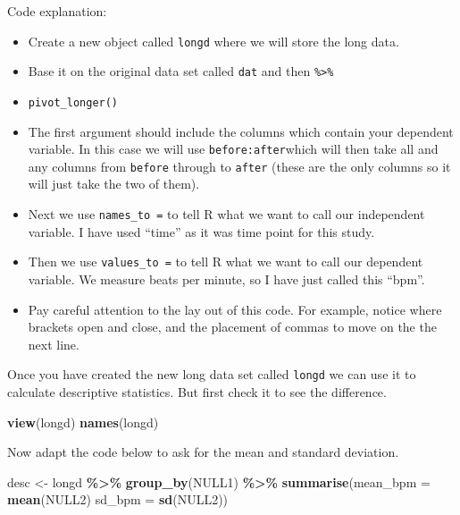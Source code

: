 \documentclass[
]{book}
\newenvironment{Shaded}{\begin{snugshade}}{\end{snugshade}}
\newcommand{\AttributeTok}[1]{\textcolor[rgb]{0.13,0.29,0.53}{#1}}
\newcommand{\FunctionTok}[1]{\textcolor[rgb]{0.13,0.29,0.53}{\textbf{#1}}}
\newcommand{\NormalTok}[1]{#1}
\newcommand{\OtherTok}[1]{\textcolor[rgb]{0.56,0.35,0.01}{#1}}
\newcommand{\SpecialCharTok}[1]{\textcolor[rgb]{0.81,0.36,0.00}{\textbf{#1}}}
\begin{document}
Code explanation:

\begin{itemize}
\item
  Create a new object called \texttt{longd} where we will store the long data.
\item
  Base it on the original data set called \texttt{dat} and then \texttt{\%\textgreater{}\%}
\item
  \texttt{pivot\_longer()}
\item
  The first argument should include the columns which contain your dependent variable. In this case we will use \texttt{before:after}which will then take all and any columns from \texttt{before} through to \texttt{after} (these are the only columns so it will just take the two of them).
\item
  Next we use \texttt{names\_to\ =} to tell R what we want to call our independent variable. I have used ``time'' as it was time point for this study.
\item
  Then we use \texttt{values\_to\ =} to tell R what we want to call our dependent variable. We measure beats per minute, so I have just called this ``bpm''.
\item
  Pay careful attention to the lay out of this code. For example, notice where brackets open and close, and the placement of commas to move on the the next line.
\end{itemize}

Once you have created the new long data set called \texttt{longd} we can use it to calculate descriptive statistics. But first check it to see the difference.

\begin{Shaded}
\begin{Highlighting}[]
\FunctionTok{view}\NormalTok{(longd)}
\FunctionTok{names}\NormalTok{(longd)}
\end{Highlighting}
\end{Shaded}

Now adapt the code below to ask for the mean and standard deviation.

\begin{Shaded}
\begin{Highlighting}[]
\NormalTok{desc }\OtherTok{\textless{}{-}}\NormalTok{ longd }\SpecialCharTok{\%\textgreater{}\%}
  \FunctionTok{group\_by}\NormalTok{(NULL1) }\SpecialCharTok{\%\textgreater{}\%}
  \FunctionTok{summarise}\NormalTok{(}\AttributeTok{mean\_bpm =} \FunctionTok{mean}\NormalTok{(NULL2)}
            \AttributeTok{sd\_bpm =} \FunctionTok{sd}\NormalTok{(NULL2))}
\end{Highlighting}
\end{Shaded}
\end{document}
